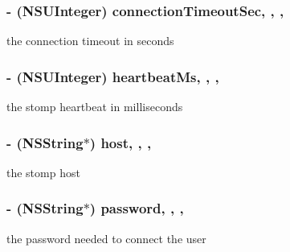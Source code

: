\subsubsection[{\texorpdfstring{connection\+Timeout\+Sec}{connectionTimeoutSec}}]{\setlength{\rightskip}{0pt plus 5cm}-\/ (N\+S\+U\+Integer) connection\+Timeout\+Sec\hspace{0.3cm}{\ttfamily [read]}, {\ttfamily [write]}, {\ttfamily [nonatomic]}, {\ttfamily [assign]}}\hypertarget{interface_s_c_stomp_configuration_a0b3c3eb58edb936494019e43eef2f7b7}{}\label{interface_s_c_stomp_configuration_a0b3c3eb58edb936494019e43eef2f7b7}
the connection timeout in seconds 
\subsubsection[{\texorpdfstring{heartbeat\+Ms}{heartbeatMs}}]{\setlength{\rightskip}{0pt plus 5cm}-\/ (N\+S\+U\+Integer) heartbeat\+Ms\hspace{0.3cm}{\ttfamily [read]}, {\ttfamily [write]}, {\ttfamily [nonatomic]}, {\ttfamily [assign]}}\hypertarget{interface_s_c_stomp_configuration_ae002e458d8e27fc4cd19e60256bc71bd}{}\label{interface_s_c_stomp_configuration_ae002e458d8e27fc4cd19e60256bc71bd}
the stomp heartbeat in milliseconds 
\subsubsection[{\texorpdfstring{host}{host}}]{\setlength{\rightskip}{0pt plus 5cm}-\/ (N\+S\+String$\ast$) host\hspace{0.3cm}{\ttfamily [read]}, {\ttfamily [write]}, {\ttfamily [nonatomic]}, {\ttfamily [retain]}}\hypertarget{interface_s_c_stomp_configuration_a534749ad7eb52e5a66f404884eda6b53}{}\label{interface_s_c_stomp_configuration_a534749ad7eb52e5a66f404884eda6b53}
the stomp host 
\subsubsection[{\texorpdfstring{password}{password}}]{\setlength{\rightskip}{0pt plus 5cm}-\/ (N\+S\+String$\ast$) password\hspace{0.3cm}{\ttfamily [read]}, {\ttfamily [write]}, {\ttfamily [nonatomic]}, {\ttfamily [retain]}}\hypertarget{interface_s_c_stomp_configuration_aa868becdadbb872edbc70ca5d636475d}{}\label{interface_s_c_stomp_configuration_aa868becdadbb872edbc70ca5d636475d}
the password needed to connect the user 
